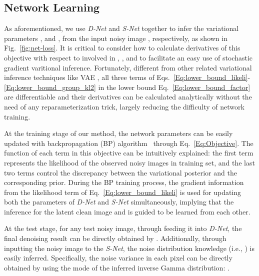 \documentclass{article}
\begin{document}
\vspace{-4mm}\subsection{Network Learning} \label{sec:inference}\vspace{-2mm}
As aforementioned, we use \textit{D-Net} and \textit{S-Net} together to infer
the variational parameters ,  and ,  from the input
noisy image , respectively, as shown in Fig.~\ref{fig:net-loss}. It is critical to consider how to
calculate derivatives of this objective with respect to  involved in , ,
 and  to facilitate an easy use of stochastic gradient varitional inference. Fortunately,
different from other related variational inference techniques
like VAE \cite{kingma2013auto}, all three terms of Eqs.~\eqref{Eq:lower_bound_likeli}-\eqref{Eq:lower_bound_group_kl2}
in the lower bound Eq.~\eqref{Eq:lower_bound_factor} are differentiable and their derivatives can be calculated
analytically without the need of any reparameterization trick, largely reducing the difficulty of network
training.

At the training stage of our method, the network parameters can be easily updated with backpropagation (BP)
algorithm~\cite{goodfellow2016deep} through Eq.~\eqref{Eq:Objective}. The function of each term in this objective can
be intuitively explained: the first term represents the likelihood of the observed noisy images in training set,
and the last two terms control the discrepancy between the variational posterior and the corresponding prior.
During the BP training process, the gradient information from the likelihood term of Eq.~\eqref{Eq:lower_bound_likeli}
is used for updating both the parameters of \textit{D-Net} and \textit{S-Net} simultaneously, implying that the
inference for the latent clean image  and  is guided to be learned from each other.

At the test stage, for any test noisy image, through feeding it into \textit{D-Net}, the final denoising
result can be directly obtained by . Additionally, through inputting the noisy image to the \textit{S-Net},
the noise distribution knowledge (i.e., ) is easily inferred. Specifically, the noise variance in
each pixel can be directly obtained by using the mode of the inferred inverse Gamma
distribution: .
\end{document}
